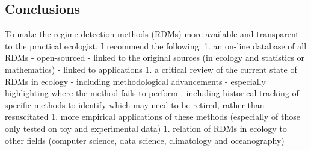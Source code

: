 \documentclass[12pt,twoside,openany]{reedthesis}
\begin{document}
\subsection{Conclusions}\label{conclusions}

To make the regime detection methods (RDMs) more available and
transparent to the practical ecologist, I recommend the following: 1. an
on-line database of all RDMs - open-sourced - linked to the original
sources (in ecology and statistics or mathematics) - linked to
applications 1. a critical review of the current state of RDMs in
ecology - including methodological advancements - especially
highlighting where the method fails to perform - including historical
tracking of specific methods to identify which may need to be retired,
rather than resuscitated 1. more empirical applications of these methods
(especially of those only tested on toy and experimental data) 1.
relation of RDMs in ecology to other fields (computer science, data
science, climatology and oceanography)
\end{document}
